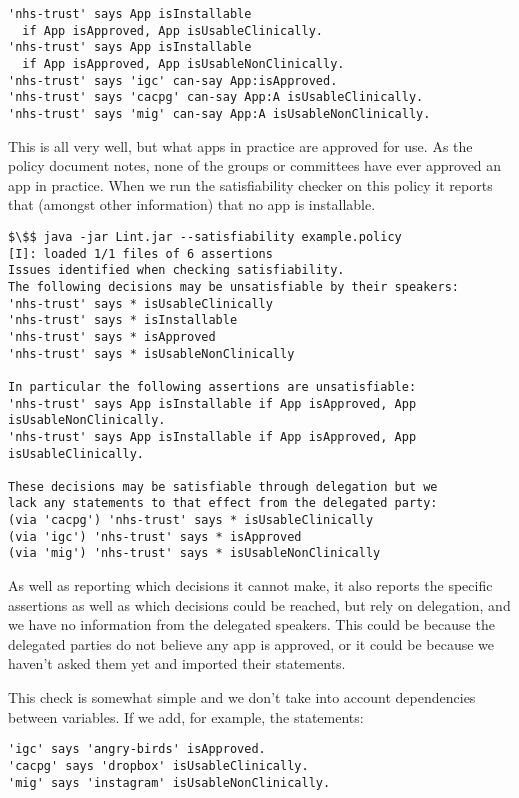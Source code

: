 \documentclass[a4paper]{scrartcl}
\begin{document}
\begin{lstlisting}
'nhs-trust' says App isInstallable
  if App isApproved, App isUsableClinically.
'nhs-trust' says App isInstallable
  if App isApproved, App isUsableNonClinically.
'nhs-trust' says 'igc' can-say App:isApproved.
'nhs-trust' says 'cacpg' can-say App:A isUsableClinically.
'nhs-trust' says 'mig' can-say App:A isUsableNonClinically.
\end{lstlisting}

This is all very well, but what apps in practice are approved for use.
As the policy document notes, none of the groups or committees have ever
approved an app in practice.  When we run the satisfiability checker on this policy
it reports that (amongst other information) that no app is installable.

\begin{lstlisting}
$\$$ java -jar Lint.jar --satisfiability example.policy
[I]: loaded 1/1 files of 6 assertions
Issues identified when checking satisfiability.
The following decisions may be unsatisfiable by their speakers:
'nhs-trust' says * isUsableClinically
'nhs-trust' says * isInstallable
'nhs-trust' says * isApproved
'nhs-trust' says * isUsableNonClinically

In particular the following assertions are unsatisfiable:
'nhs-trust' says App isInstallable if App isApproved, App isUsableNonClinically.
'nhs-trust' says App isInstallable if App isApproved, App isUsableClinically.

These decisions may be satisfiable through delegation but we
lack any statements to that effect from the delegated party:
(via 'cacpg') 'nhs-trust' says * isUsableClinically
(via 'igc') 'nhs-trust' says * isApproved
(via 'mig') 'nhs-trust' says * isUsableNonClinically
\end{lstlisting}

As well as reporting which decisions it cannot make, it also reports the
specific assertions as well as which decisions could be reached, but rely on
delegation, and we have no information from the delegated speakers.  This could
be because the delegated parties do not believe any app is approved, or it could
be because we haven't asked them yet and imported their statements.

This check is somewhat simple and we don't take into account dependencies
between variables.  If we add, for example, the statements:

\begin{lstlisting}
'igc' says 'angry-birds' isApproved.
'cacpg' says 'dropbox' isUsableClinically.
'mig' says 'instagram' isUsableNonClinically.
\end{lstlisting}
\end{document}
